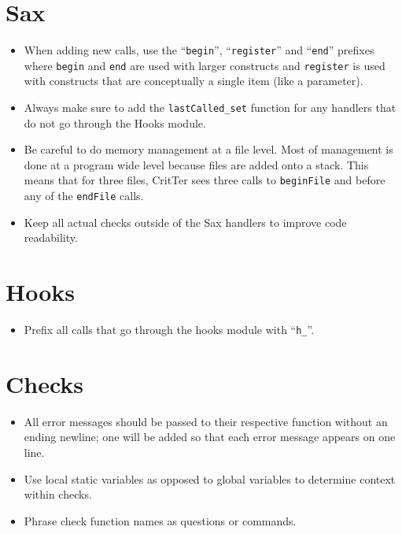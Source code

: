 \documentclass[12pt]{report}
\newcommand{\programName}{CritTer\xspace}
\begin{document}
\section{Sax}
\begin{itemize}
\item When adding new calls, use the ``\lstinline{begin}'', ``\lstinline{register}'' and ``\lstinline{end}'' prefixes where \lstinline{begin} and \lstinline{end} are used with larger constructs and \lstinline{register} is used with constructs that are conceptually a single item (like a parameter).
\item Always make sure to add the \lstinline{lastCalled_set} function for any handlers that do not go through the Hooks module.
\item Be careful to do memory management at a file level. Most of management is done at a program wide level because files are added onto a stack. This means that for three files, \programName sees three calls to \lstinline{beginFile} and before any of the \lstinline{endFile} calls.
\item Keep all actual checks outside of the Sax handlers to improve code readability.
\end{itemize}

\section{Hooks}
\begin{itemize}
\item Prefix all calls that go through the hooks module with ``\lstinline{h_}''.

\end{itemize}

\section{Checks}
\begin{itemize}
\item All error messages should be passed to their respective function without an ending newline; one 
will be added so that each error message appears on one line.
\item Use local static variables as opposed to global variables to determine context within checks.
\item Phrase check function names as questions or commands.
\end{itemize}

\nocite{*}

\clearpage
{}
{}

\end{document}
